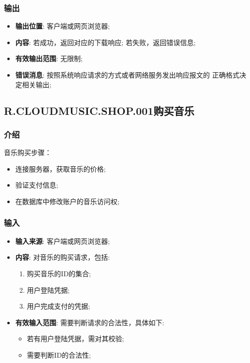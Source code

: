 \subsubsection{输出}
\begin{itemize}
	\item \textbf{输出位置}: 客户端或网页浏览器;
	\item \textbf{内容}: 若成功，返回对应的下载响应; 若失败，返回错误信息;
	\item \textbf{有效输出范围}: 无限制;
	\item \textbf{错误消息}: 按照系统响应请求的方式或者网络服务发出响应报文的
		正确格式决定相关输出;
\end{itemize}

\subsection{R.CLOUDMUSIC.SHOP.001购买音乐}
\subsubsection{介绍}
	音乐购买步骤：
	\begin{itemize}
		\item 连接服务器，获取音乐的价格;
		\item 验证支付信息;
		\item 在数据库中修改账户的音乐访问权;
	\end{itemize}
\subsubsection{输入}
	\begin{itemize}
		\item \textbf{输入来源}: 客户端或网页浏览器;
		\item \textbf{内容}: 对音乐的购买请求，包括: 
		\begin{enumerate}
			\item 购买音乐的ID的集合;
			\item 用户登陆凭据;
			\item 用户完成支付的凭据;
		\end{enumerate}
		\item \textbf{有效输入范围}: 需要判断请求的合法性，具体如下: 
		\begin{itemize}
			\item 若有用户登陆凭据，需对其校验;
			\item 需要判断ID的合法性;
		\end{itemize}
	\end{itemize}

